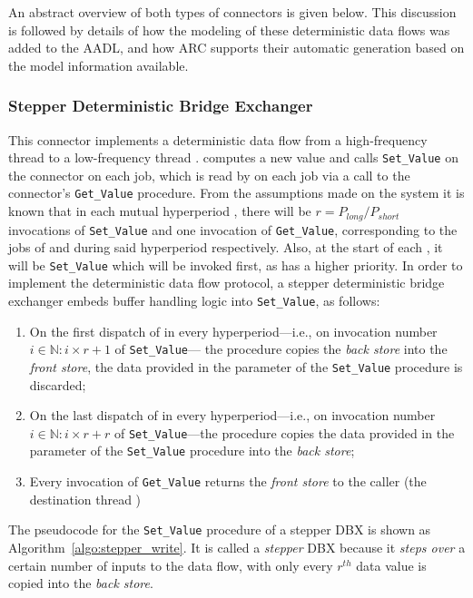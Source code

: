 An abstract overview of both types of connectors is given below. This
discussion is followed by details of how the modeling of these
deterministic data flows was added to the AADL, and how ARC supports
their automatic generation based on the model information available.

\subsubsection{Stepper Deterministic Bridge Exchanger}
This connector implements a deterministic data flow from a
high-frequency thread \ts to a low-frequency thread \tl. \ts computes
a new value and calls \texttt{Set\_Value} on the connector on each
job, which is read by \tl on each job via a call to the connector's
\texttt{Get\_Value} procedure. From the assumptions made on the system
it is known that in each mutual hyperperiod \plong, there will be
$r=P_{long}/P_{short}$ invocations of \texttt{Set\_Value} and one
invocation of \texttt{Get\_Value}, corresponding to the jobs of \ts
and \tl during said hyperperiod respectively. Also, at the start of
each \plong, it will be \texttt{Set\_Value} which will be invoked
first, as \ts has a higher priority. In order to implement the
deterministic data flow protocol, a stepper deterministic bridge
exchanger embeds buffer handling logic into \texttt{Set\_Value}, as
follows:

\begin{enumerate}
\item{On the first dispatch of \ts in every hyperperiod---i.e., on
  invocation number $i\in\mathbb{N}:i\times r+1$ of
  \texttt{Set\_Value}--- the procedure copies the \emph{back store}
  into the \emph{front store}, the data provided in the parameter of
  the \texttt{Set\_Value} procedure is discarded;}
\item{On the last dispatch of \ts in every hyperperiod---i.e., on
  invocation number $i\in\mathbb{N}:i\times r+r$ of
  \texttt{Set\_Value}---the procedure copies the data provided in the
  parameter of the \texttt{Set\_Value} procedure into the \emph{back
    store};}
\item{Every invocation of \texttt{Get\_Value} returns the \emph{front
    store} to the caller (the destination thread \tl)}
\end{enumerate}

The pseudocode for the \texttt{Set\_Value} procedure of a stepper DBX
is shown as Algorithm~\ref{algo:stepper_write}. It is called a
\emph{stepper} DBX because it \emph{steps over} a certain number of
inputs to the data flow, with only every $r^{th}$ data value is copied
into the \emph{back store}.

